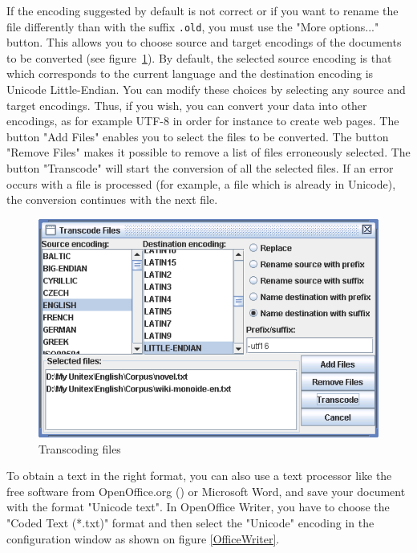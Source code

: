 \noindent If the encoding suggested by default is not correct  or if you want to
rename the file differently than with the suffix \verb$.old$, you must use the "More options..." 
button. This allows you to choose source and
target encodings of the documents to be converted (see figure~\ref{transcoding}). By default,
the selected source encoding is that which corresponds to the current language
and the destination encoding is Unicode Little-Endian. You can modify these choices by selecting
any source and target encodings. Thus, if you wish, you can convert your data
into other encodings, as for example UTF-8 in order for instance to create web pages. The button
"Add Files" enables you to select the files to be converted. The button "Remove Files" makes it
possible to remove a list of files erroneously selected. The button "Transcode" will start the
conversion of all the selected files. If an error occurs with a file is
processed (for example, a file which is already in Unicode), the 
conversion continues with the next file.


\begin{figure}[!h]
\begin{center}
\includegraphics[width=12cm]{resources/img/fig2-3.png}
\caption{\label{transcoding}Transcoding files}
\end{center}
\end{figure}

\noindent To obtain a text in the right format, you can also use a text
processor like the free software from OpenOffice.org  (\cite{OpenOffice}) or Microsoft Word, and
save your document with the format "Unicode text".
In OpenOffice Writer, you have to choose the "Coded Text (*.txt)" format and then
select the "Unicode" encoding in the configuration window as shown on figure
\ref{OfficeWriter}.

